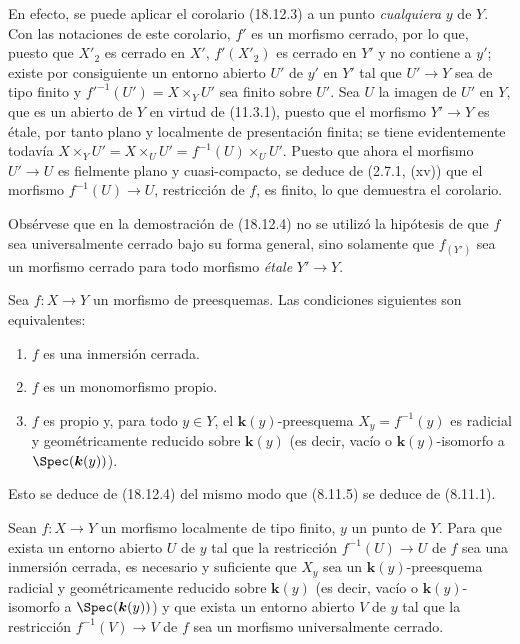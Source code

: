 En efecto, se puede aplicar el corolario (18.12.3) a un punto \emph{cualquiera} $y$ de $Y$. Con las notaciones de este corolario, $f'$ es un morfismo cerrado, por lo que, puesto que $X'_2$ es cerrado en $X'$, $f'(X'_2)$ es cerrado en $Y'$ y no contiene a $y'$; existe por consiguiente un entorno abierto $U'$ de $y'$ en $Y'$ tal que $U'\to Y$ sea de tipo finito y $f'^{-1}(U')=X\times_Y U'$ sea finito sobre $U'$. Sea $U$ la imagen de $U'$ en $Y$, que es un abierto de $Y$ en virtud de (11.3.1), puesto que el morfismo $Y'\to Y$ es étale, por tanto plano y localmente de presentación finita; se tiene evidentemente todavía $X\times_Y U'=X\times_U U'=f^{-1}(U)\times_U U'$. Puesto que ahora el morfismo $U'\to U$ es fielmente plano y cuasi-compacto, se deduce de (2.7.1, (xv)) que el morfismo $f^{-1}(U)\to U$, restricción de $f$, es finito, lo que demuestra el corolario.

\begin{remark}[18.12.5]
\label{IV.18.12.5}
Obsérvese que en la demostración de (18.12.4) no se utilizó la hipótesis de que $f$ sea universalmente cerrado bajo su forma general, sino solamente que $f_{(Y')}$ sea un morfismo cerrado para todo morfismo \emph{étale} $Y'\to Y$.
\end{remark}

\begin{corollary}[18.12.6]
\label{IV.18.12.6}
Sea $f:X\to Y$ un morfismo de preesquemas. Las condiciones siguientes son equivalentes:
\begin{enumerate}
  \item[\textup{a)}] $f$ es una inmersión cerrada.
  \item[\textup{b)}] $f$ es un monomorfismo propio.
  \item[\textup{c)}] $f$ es propio y, para todo $y\in Y$, el $\boldsymbol k(y)$-preesquema $X_y=f^{-1}(y)$ es radicial y geométricamente reducido sobre $\boldsymbol k(y)$ (es decir, vacío o $\boldsymbol k(y)$-isomorfo a $\Spec(\boldsymbol k(y))$).
\end{enumerate}
\end{corollary}

Esto se deduce de (18.12.4) del mismo modo que (8.11.5) se deduce de (8.11.1).

\begin{proposition}[18.12.7]
\label{IV.18.12.7}
Sean $f:X\to Y$ un morfismo localmente de tipo finito, $y$ un punto de $Y$. Para que exista un entorno abierto $U$ de $y$ tal que la restricción $f^{-1}(U)\to U$ de $f$ sea una inmersión cerrada, es necesario y suficiente que $X_y$ sea un $\boldsymbol k(y)$-preesquema radicial y geométricamente reducido sobre $\boldsymbol k(y)$ (es decir, vacío o $\boldsymbol k(y)$-isomorfo a $\Spec(\boldsymbol k(y))$) y que exista un entorno abierto $V$ de $y$ tal que la restricción $f^{-1}(V)\to V$ de $f$ sea un morfismo universalmente cerrado.
\end{proposition}

